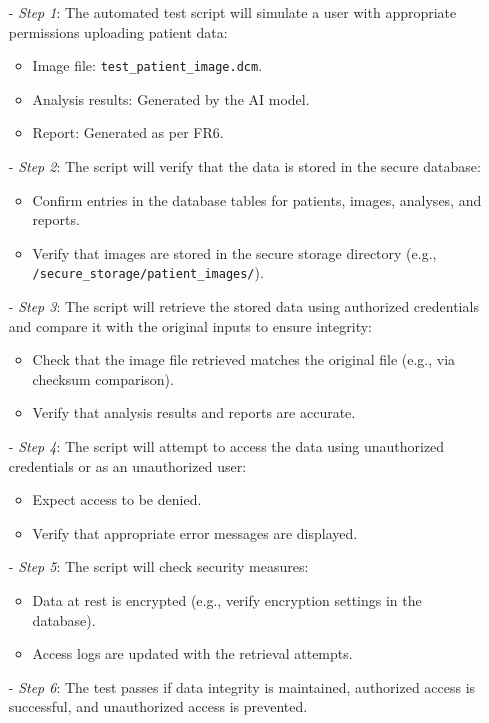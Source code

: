 \documentclass[12pt, titlepage]{article}
\begin{document}
\begin{enumerate}
  \begin{itemize}
  \item[-] \textit{Step 1}: The automated test script will simulate a user with appropriate permissions uploading patient data:
    \begin{itemize}
      \item Image file: \texttt{test\_patient\_image.dcm}.
      \item Analysis results: Generated by the AI model.
      \item Report: Generated as per FR6.
    \end{itemize}
  \item[-] \textit{Step 2}: The script will verify that the data is stored in the secure database:
    \begin{itemize}
      \item Confirm entries in the database tables for patients, images, analyses, and reports.
      \item Verify that images are stored in the secure storage directory (e.g., \texttt{/secure\_storage/patient\_images/}).
    \end{itemize}
  \item[-] \textit{Step 3}: The script will retrieve the stored data using authorized credentials and compare it with the original inputs to ensure integrity:
    \begin{itemize}
      \item Check that the image file retrieved matches the original file (e.g., via checksum comparison).
      \item Verify that analysis results and reports are accurate.
    \end{itemize}
  \item[-] \textit{Step 4}: The script will attempt to access the data using unauthorized credentials or as an unauthorized user:
    \begin{itemize}
      \item Expect access to be denied.
      \item Verify that appropriate error messages are displayed.
    \end{itemize}
  \item[-] \textit{Step 5}: The script will check security measures:
    \begin{itemize}
      \item Data at rest is encrypted (e.g., verify encryption settings in the database).
      \item Access logs are updated with the retrieval attempts.
    \end{itemize}
  \item[-] \textit{Step 6}: The test passes if data integrity is maintained, authorized access is successful, and unauthorized access is prevented.
  \end{itemize}
  
  \end{enumerate}
\end{document}
